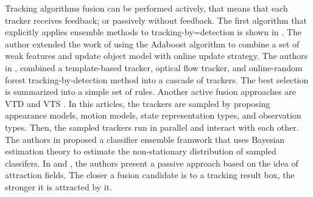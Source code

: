 Tracking algorithms fusion can be performed actively, that means that each tracker receives feedback; or passively without feedback. The first algorithm that explicitly applies ensemble methods to tracking-by=detection is shown in \cite{Avidan2007}. The author extended the work of \cite{Collins2005} using the Adaboost algorithm to combine a set of weak features and update object model with online update strategy. The authors in \cite{Santner2010}, combined a template-based tracker, optical flow tracker, and online-random forest tracking-by-detection method into a cascade of trackers. The best selection is summarized into a simple set of rules. Another active fusion approaches are VTD \cite{Kwon2010} and VTS \cite{Kwon2011}. In this articles, the trackers are sampled by proposing appearance models, motion models, state representation types, and observation types. Then, the sampled trackers run in parallel and interact with each other. The authors in \cite{Bai2013} proposed a classifier ensemble framwork that uses Bayesian estimation theory to estimate the non-stationary distribution of sampled classifers. In \cite{Bailer2013} and \cite{Bailer2014}, the authors present a passive approach based on the idea of attraction fields. The closer a fusion candidate is to a tracking result box, the stronger it is attracted by it.